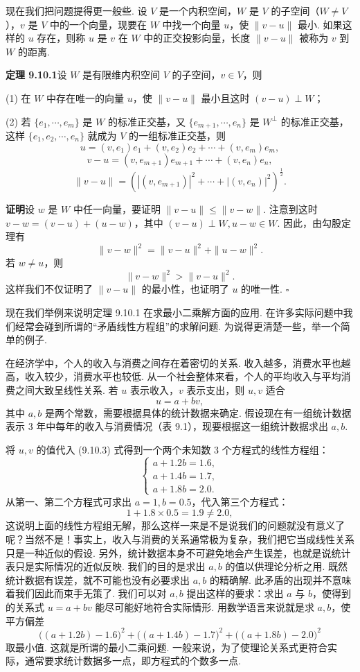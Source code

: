 \documentclass[UTF8,12pt,a4paper,fontset=fandol]{ctexart}
\begin{document}
现在我们把问题提得更一般些. 设 $V$ 是一个内积空间，$W$ 是 $V$ 的子空间（$W\ne V$），$v$ 是 $V$ 中的一个向量，现要在 $W$ 中找一个向量 $u$，使 $\|v-u\|$ 最小. 如果这样的 $u$ 存在，则称 $u$ 是 $v$ 在 $W$ 中的正交投影向量，长度 $\|v-u\|$ 被称为 $v$ 到 $W$ 的距离.

\noindent\textbf{定理 9.10.1}\quad 设 $W$ 是有限维内积空间 $V$ 的子空间，$v\in V$，则

(1) 在 $W$ 中存在唯一的向量 $u$，使 $\|v-u\|$ 最小且这时 $(v-u)\perp W$；

(2) 若 $\{e_1,\cdots,e_m\}$ 是 $W$ 的标准正交基，又 $\{e_{m+1},\cdots,e_n\}$ 是 $W^\perp$ 的标准正交基，这样 $\{e_1,e_2,\cdots,e_n\}$ 就成为 $V$ 的一组标准正交基，则
\[
  u=(v,e_1)e_1+(v,e_2)e_2+\cdots+(v,e_m)e_m,
\]
\[
  v-u=(v,e_{m+1})e_{m+1}+\cdots+(v,e_n)e_n,
\]
\begin{equation}
  \|v-u\|=\left(|(v,e_{m+1})|^2+\cdots+|(v,e_n)|^2\right)^{\frac12}.
  \tag{9.10.2}
\end{equation}

\noindent\textbf{证明}\quad 设 $w$ 是 $W$ 中任一向量，要证明 $\|v-u\|\le\|v-w\|$. 注意到这时 $v-w=(v-u)+(u-w)$，其中 $(v-u)\perp W,u-w\in W$. 因此，由勾股定理有
\[
  \|v-w\|^2=\|v-u\|^2+\|u-w\|^2.
\]
若 $w\ne u$，则
\[
  \|v-w\|^2>\|v-u\|^2.
\]
这样我们不仅证明了 $\|v-u\|$ 的最小性，也证明了 $u$ 的唯一性. $\square$

现在我们举例来说明定理 9.10.1 在求最小二乘解方面的应用. 在许多实际问题中我们经常会碰到所谓的“矛盾线性方程组”的求解问题. 为说得更清楚一些，举一个简单的例子.

在经济学中，个人的收入与消费之间存在着密切的关系. 收入越多，消费水平也越高，收入较少，消费水平也较低. 从一个社会整体来看，个人的平均收入与平均消费之间大致呈线性关系. 若 $u$ 表示收入，$v$ 表示支出，则 $u,v$ 适合
\begin{equation}
  u=a+bv,
  \tag{9.10.3}
\end{equation}
其中 $a,b$ 是两个常数，需要根据具体的统计数据来确定. 假设现在有一组统计数据表示 $3$ 年中每年的收入与消费情况（表 9.1），现要根据这一组统计数据求出 $a,b$.

将 $u,v$ 的值代入 (9.10.3) 式得到一个两个未知数 $3$ 个方程式的线性方程组：
\[
  \begin{cases}
    a+1.2b=1.6,\\
    a+1.4b=1.7,\\
    a+1.8b=2.0.
  \end{cases}
\]
从第一、第二个方程式可求出 $a=1,b=0.5$，代入第三个方程式：
\[
  1+1.8\times0.5=1.9\ne2.0,
\]
这说明上面的线性方程组无解，那么这样一来是不是说我们的问题就没有意义了呢？当然不是！事实上，收入与消费的关系通常极为复杂，我们把它当成线性关系只是一种近似的假设. 另外，统计数据本身不可避免地会产生误差，也就是说统计表只是实际情况的近似反映. 我们的目的是求出 $a,b$ 的值以供理论分析之用. 既然统计数据有误差，就不可能也没有必要求出 $a,b$ 的精确解. 此矛盾的出现并不意味着我们因此而束手无策了. 我们可以对 $a,b$ 提出这样的要求：求出 $a$ 与 $b$，使得到的关系式 $u=a+bv$ 能尽可能好地符合实际情形. 用数学语言来说就是求 $a,b$，使平方偏差
\[
  \big((a+1.2b)-1.6\big)^2+\big((a+1.4b)-1.7\big)^2+\big((a+1.8b)-2.0\big)^2
\]
取最小值. 这就是所谓的最小二乘问题. 一般来说，为了使理论关系式更符合实际，通常要求统计数据多一点，即方程式的个数多一点.
\end{document}
